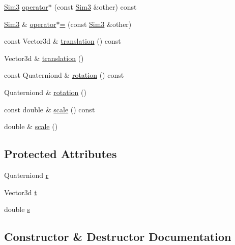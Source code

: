 \begin{DoxyCompactItemize}
\item 
\mbox{\hyperlink{structg2o_1_1_sim3}{Sim3}} \mbox{\hyperlink{structg2o_1_1_sim3_a6bf3dee27d6c5e634c7c07974bf59d39}{operator$\ast$}} (const \mbox{\hyperlink{structg2o_1_1_sim3}{Sim3}} \&other) const
\item 
\mbox{\hyperlink{structg2o_1_1_sim3}{Sim3}} \& \mbox{\hyperlink{structg2o_1_1_sim3_aaad597f4a82aef284896be4c6a79aeb9}{operator$\ast$=}} (const \mbox{\hyperlink{structg2o_1_1_sim3}{Sim3}} \&other)
\item 
const Vector3d \& \mbox{\hyperlink{structg2o_1_1_sim3_a835afb1f821f19ad4ef3c7c2408c8660}{translation}} () const
\item 
Vector3d \& \mbox{\hyperlink{structg2o_1_1_sim3_a1429af2d97c44cd364d748ef07998593}{translation}} ()
\item 
const Quaterniond \& \mbox{\hyperlink{structg2o_1_1_sim3_a617d35def39dbe374432980982bb9073}{rotation}} () const
\item 
Quaterniond \& \mbox{\hyperlink{structg2o_1_1_sim3_a4528a501c958cd71fcc6fdef74db99cc}{rotation}} ()
\item 
const double \& \mbox{\hyperlink{structg2o_1_1_sim3_a1eede88e7b9485c1de90a0c79cb095a3}{scale}} () const
\item 
double \& \mbox{\hyperlink{structg2o_1_1_sim3_a062649c3de81c514518e1095c0e49eeb}{scale}} ()
\end{DoxyCompactItemize}
\subsection*{Protected Attributes}
\begin{DoxyCompactItemize}
\item 
Quaterniond \mbox{\hyperlink{structg2o_1_1_sim3_a55dbe5c6ffe22526f20e05f0c23aa832}{r}}
\item 
Vector3d \mbox{\hyperlink{structg2o_1_1_sim3_a3ef879fb13b88732428bd2f2a558d11c}{t}}
\item 
double \mbox{\hyperlink{structg2o_1_1_sim3_a2cad7c49340494d4bdd28a497e4cb486}{s}}
\end{DoxyCompactItemize}


\subsection{Constructor \& Destructor Documentation}
\mbox{\label{structg2o_1_1_sim3_adf1277575fc039d1ae643ae018e464fe}} 
